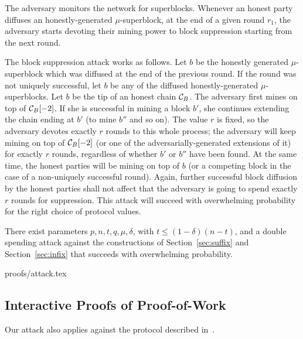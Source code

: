 The adversary monitors the network for superblocks. Whenever an honest party
diffuses an honestly-generated $\mu$-superblock,
at the end of a given round $r_1$, the adversary starts devoting their mining
power to block suppression starting from the next round.

The block suppression attack works as follows. Let $b$ be the honestly generated
$\mu$-superblock which was diffused at the end of the previous round. If the
round was not uniquely successful, let $b$ be any of the diffused
honestly-generated $\mu$-superblocks. Let $b$ be the tip of an honest chain
$\mathcal{C}_B$. The adversary first mines on top of $\mathcal{C}_B[-2]$. If she is
successful in mining a block $b'$, she continues extending the chain ending
at $b'$ (to mine $b''$ and so on). The value $r$ is fixed, so the adversary
devotes exactly $r$ rounds to this whole process; the adversary will keep mining
on top of $\mathcal{C}_B[-2]$ (or one of the adversarially-generated extensions of
it) for exactly $r$ rounds, regardless of whether $b'$ or $b''$ have been found.
At the same time, the honest parties will be mining on top of $b$ (or a
competing block in the case of a non-uniquely successful round). Again, further
successful block diffusion by the honest parties shall not affect that the
adversary is going to spend exactly $r$ rounds for suppression.
This attack will succeed with overwhelming probability for the right choice
of protocol values.

\begin{theorem}
There exist parameters $p, n, t, q,  \mu, \delta$, with $t\leq (1-\delta)(n-t)$,
and a double spending attack against the constructions of
Section~\ref{sec:suffix} and Section~\ref{sec:infix} that succeeds with
overwhelming probability.
\end{theorem}
{proofs/attack.tex}

\subsection{Interactive Proofs of Proof-of-Work}
Our attack also applies against the protocol described in~\cite{KLS}.

